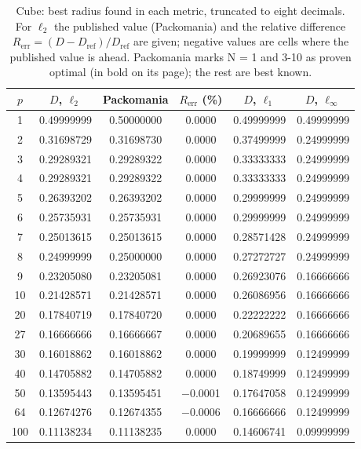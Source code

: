 \begin{table}[t]
  \centering
  \caption{Cube: best radius found in each metric, truncated to eight decimals. For $\ell_2$ the published value (Packomania) and the relative difference $R_{\text{err}} = (D - D_{\mathrm{ref}})/D_{\mathrm{ref}}$ are given; negative values are cells where the published value is ahead. Packomania marks N = 1 and 3-10 as proven optimal (in bold on its page); the rest are best known.}
  \label{tab:cube}
  \begin{tabular}{cccccc}
    \hline
    $p$ & $D$, $\ell_2$ & Packomania & $R_{\text{err}}$ (\%) & $D$, $\ell_1$ & $D$, $\ell_\infty$ \\
    \hline
    1 & 0.49999999 & 0.50000000 & 0.0000 & 0.49999999 & 0.49999999 \\
    2 & 0.31698729 & 0.31698730 & 0.0000 & 0.37499999 & 0.24999999 \\
    3 & 0.29289321 & 0.29289322 & 0.0000 & 0.33333333 & 0.24999999 \\
    4 & 0.29289321 & 0.29289322 & 0.0000 & 0.33333333 & 0.24999999 \\
    5 & 0.26393202 & 0.26393202 & 0.0000 & 0.29999999 & 0.24999999 \\
    6 & 0.25735931 & 0.25735931 & 0.0000 & 0.29999999 & 0.24999999 \\
    7 & 0.25013615 & 0.25013615 & 0.0000 & 0.28571428 & 0.24999999 \\
    8 & 0.24999999 & 0.25000000 & 0.0000 & 0.27272727 & 0.24999999 \\
    9 & 0.23205080 & 0.23205081 & 0.0000 & 0.26923076 & 0.16666666 \\
    10 & 0.21428571 & 0.21428571 & 0.0000 & 0.26086956 & 0.16666666 \\
    20 & 0.17840719 & 0.17840720 & 0.0000 & 0.22222222 & 0.16666666 \\
    27 & 0.16666666 & 0.16666667 & 0.0000 & 0.20689655 & 0.16666666 \\
    30 & 0.16018862 & 0.16018862 & 0.0000 & 0.19999999 & 0.12499999 \\
    40 & 0.14705882 & 0.14705882 & 0.0000 & 0.18749999 & 0.12499999 \\
    50 & 0.13595443 & 0.13595451 & $-$0.0001 & 0.17647058 & 0.12499999 \\
    64 & 0.12674276 & 0.12674355 & $-$0.0006 & 0.16666666 & 0.12499999 \\
    100 & 0.11138234 & 0.11138235 & 0.0000 & 0.14606741 & 0.09999999 \\
    \hline
  \end{tabular}
\end{table}
